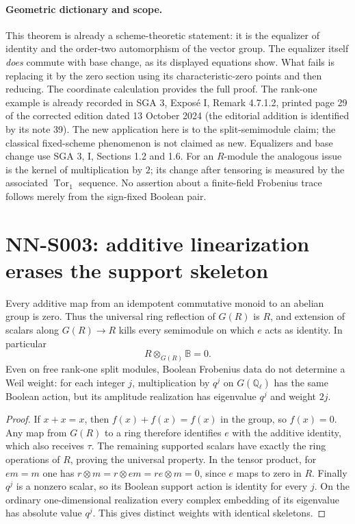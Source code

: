 \paragraph{Geometric dictionary and scope.}
This theorem is already a scheme-theoretic statement: it is the
equalizer of identity and the order-two automorphism of the vector
group. The equalizer itself \emph{does} commute with base change,
as its displayed equations show. What fails is replacing it by the
zero section using its characteristic-zero points and then reducing.
The coordinate calculation provides the full proof. The rank-one
example is already recorded in SGA 3, Expos\'e I, Remark 4.7.1.2,
printed page 29 of the corrected edition dated 13 October 2024
(the editorial addition is identified by its note 39). The new
application here is to the split-semimodule claim; the classical
fixed-scheme phenomenon is not claimed as new. Equalizers and base
change use SGA 3, I, Sections 1.2 and 1.6.
For an $R$-module the analogous issue is the kernel of multiplication
by $2$; its change after tensoring is measured by the associated
$\operatorname{Tor}_1$ sequence. No assertion about a finite-field
Frobenius trace follows merely from the sign-fixed Boolean pair.

\section{NN-S003: additive linearization erases the support skeleton}
\label{sec:NN-S003}

\begin{theorem}[NN-S003]
Every additive map from an idempotent commutative monoid to an
abelian group is zero. Thus the universal ring reflection of $G(R)$
is $R$, and extension of scalars along $G(R)\to R$ kills every
semimodule on which $e$ acts as identity. In particular
\[
 R\otimes_{G(R)}\mathbb B=0.
\]
Even on free rank-one split modules, Boolean Frobenius data do not
determine a Weil weight: for each integer $j$, multiplication by
$q^j$ on $G(\mathbb Q_\ell)$ has the same Boolean action, but its
amplitude realization has eigenvalue $q^j$ and weight $2j$.
\end{theorem}

\begin{proof}
If $x+x=x$, then $f(x)+f(x)=f(x)$ in the group, so $f(x)=0$.
Any map from $G(R)$ to a ring therefore identifies $e$ with the
additive identity, which also receives $\tau$. The remaining
supported scalars have exactly the ring operations of $R$, proving
the universal property. In the tensor product, for $em=m$ one has
$r\otimes m=r\otimes em=re\otimes m=0$, since $e$ maps to zero
in $R$. Finally $q^j$ is a nonzero scalar, so its Boolean support
action is identity for every $j$. On the ordinary one-dimensional
realization every complex embedding of its eigenvalue has absolute
value $q^j$. This gives distinct weights with identical skeletons.
\end{proof}

